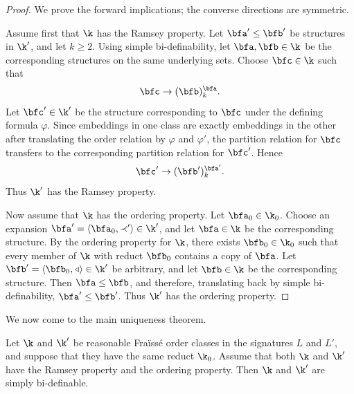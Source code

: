 \begin{proof}
    We prove the forward implications; the converse directions are symmetric.

    Assume first that $\k$ has the Ramsey property. Let
    \(\bfa'\leq \bfb'\)
    be structures in $\k'$, and let $k\geq 2$. Using simple bi-definability, let $\bfa,\bfb\in\k$ be the corresponding structures on the same underlying sets. Choose
    \(\bfc\in\k\)
    such that
    \[
        \bfc\to (\bfb)^{\bfa}_k.
    \]
    Let $\bfc'\in\k'$ be the structure corresponding to $\bfc$ under the defining formula $\varphi$. Since embeddings in one class are exactly embeddings in the other after translating the order relation by $\varphi$ and $\varphi'$, the partition relation for $\bfc$ transfers to the corresponding partition relation for $\bfc'$. Hence
    \[
        \bfc'\to (\bfb')^{\bfa'}_k.
    \]
    Thus $\k'$ has the Ramsey property.

    Now assume that $\k$ has the ordering property. Let \(\bfa_0\in\k_0\).
    Choose an expansion
    \(\bfa'=\langle \bfa_0,\prec'\rangle\in\k'\),
    and let $\bfa\in\k$ be the corresponding structure. By the ordering property for $\k$, there exists
    \(\bfb_0\in\k_0\)
    such that every member of $\k$ with reduct $\bfb_0$ contains a copy of $\bfa$. Let
    \(\bfb'=\langle \bfb_0,\triangleleft\rangle\in\k'\)
    be arbitrary, and let $\bfb\in\k$ be the corresponding structure. Then
    \(\bfa\leq \bfb\),
    and therefore, translating back by simple bi-definability,
    \(\bfa'\leq \bfb'\).
    Thus $\k'$ has the ordering property.
\end{proof}

We now come to the main uniqueness theorem.

\begin{theorem}
    \label{thm:uniqueness-simple-bi-definability}
    Let $\k$ and $\k'$ be reasonable Fra\"iss\'e order classes in the
    signatures $L$ and $L'$, and suppose that they have the same reduct
    \(\k_0\).
    Assume that both $\k$ and $\k'$ have the Ramsey property and the ordering property. Then $\k$ and $\k'$ are simply bi-definable.
\end{theorem}

